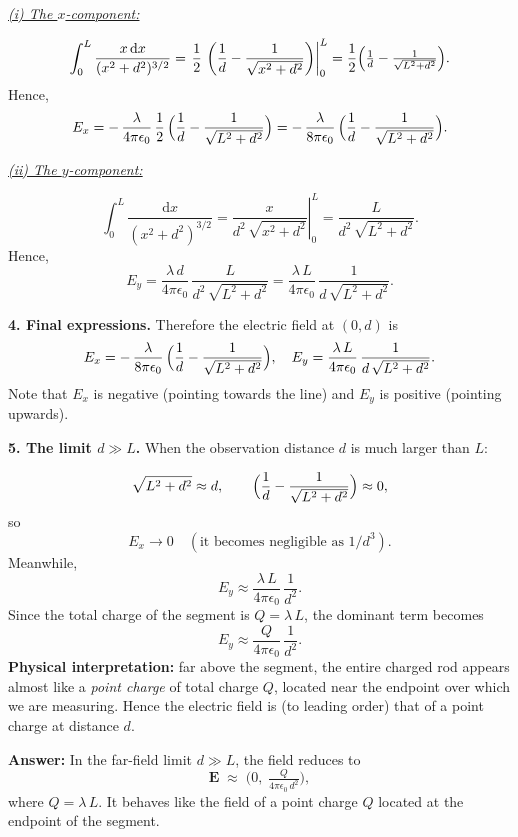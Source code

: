 \documentclass{article}
\begin{document}
\bigskip
\noindent
\underline{\emph{(i) The $x$-component:}}

\[
\int_{0}^{L} \frac{x\,\mathrm{d}x}{(x^2 + d^2)^{3/2}}
= \left.\frac{1}{2}\,\left(\frac{1}{d} - \frac{1}{\sqrt{x^2 + d^2}}\right)\right|_0^L 
= \frac{1}{2}\Bigl(\tfrac{1}{d} - \tfrac{1}{\sqrt{L^2 + d^2}}\Bigr).
\]
Hence,
\[
E_x = -\,\frac{\lambda}{4\pi\epsilon_0}\,\frac{1}{2}\,
\Bigl(\frac{1}{d} - \frac{1}{\sqrt{L^2 + d^2}}\Bigr)
= -\,\frac{\lambda}{8\pi\epsilon_0}\,
\Bigl(\frac{1}{d} - \frac{1}{\sqrt{L^2 + d^2}}\Bigr).
\]

\bigskip
\noindent
\underline{\emph{(ii) The $y$-component:}}

\[
\int_{0}^{L} \frac{\mathrm{d}x}{(x^2 + d^2)^{3/2}}
= \left.\frac{x}{d^2\,\sqrt{x^2 + d^2}}\right|_0^L 
= \frac{L}{d^2\,\sqrt{L^2 + d^2}}.
\]
Hence,
\[
E_y 
= \frac{\lambda\,d}{4\pi\epsilon_0}\,\frac{L}{d^2\,\sqrt{L^2 + d^2}}
= \frac{\lambda\,L}{4\pi\epsilon_0}\,\frac{1}{d\,\sqrt{L^2 + d^2}}.
\]

\bigskip
\noindent
\textbf{4. Final expressions.} 
Therefore the electric field at $(0,d)$ is
\[
E_x 
= -\,\frac{\lambda}{8\pi\epsilon_0}\,
\Bigl(\frac{1}{d} - \frac{1}{\sqrt{L^2 + d^2}}\Bigr), 
\quad
E_y 
= \frac{\lambda\,L}{4\pi\epsilon_0}\,\frac{1}{d\,\sqrt{L^2 + d^2}}.
\]
Note that $E_x$ is negative (pointing towards the line) and $E_y$ is positive (pointing upwards).

\bigskip
\noindent
\textbf{5. The limit $d \gg L$.} 
When the observation distance $d$ is much larger than $L$:

\[
\sqrt{L^2 + d^2} \approx d, 
\qquad
\Bigl(\frac{1}{d} - \frac{1}{\sqrt{L^2 + d^2}}\Bigr) \approx 0, 
\]
so
\[
E_x \to 0 
\quad (\text{it becomes negligible as } 1/d^3). 
\]
Meanwhile, 
\[
E_y 
\approx \frac{\lambda\,L}{4\pi\epsilon_0}\,\frac{1}{d^2}. 
\]
Since the total charge of the segment is $Q = \lambda\,L$, 
the dominant term becomes 
\[
E_y \approx \frac{Q}{4\pi\epsilon_0}\,\frac{1}{d^2}.
\]
\textbf{Physical interpretation:} far above the segment, the entire charged rod appears almost like a \emph{point charge} of total charge $Q$, located near the endpoint over which we are measuring. 
Hence the electric field is (to leading order) that of a point charge at distance $d$. 

\bigskip
\noindent
\textbf{Answer:} 
In the far-field limit $d \gg L$, the field reduces to 
\[
\mathbf{E} \;\approx\; \bigl(0,\;\tfrac{Q}{4\pi\epsilon_0\,d^2}\bigr),
\]
where $Q = \lambda\,L$. 
It behaves like the field of a point charge $Q$ located at the endpoint of the segment.
\end{document}
